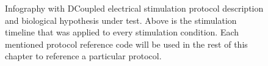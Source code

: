 \begin{figure}
\caption{Infography with DCoupled electrical stimulation protocol description and biological hypothesis under test. Above is the stimulation timeline that was applied to every stimulation condition. Each mentioned protocol reference code will be used in the rest of this chapter to reference a particular protocol.}
\label{fig_t4d1}
\end{figure} 

